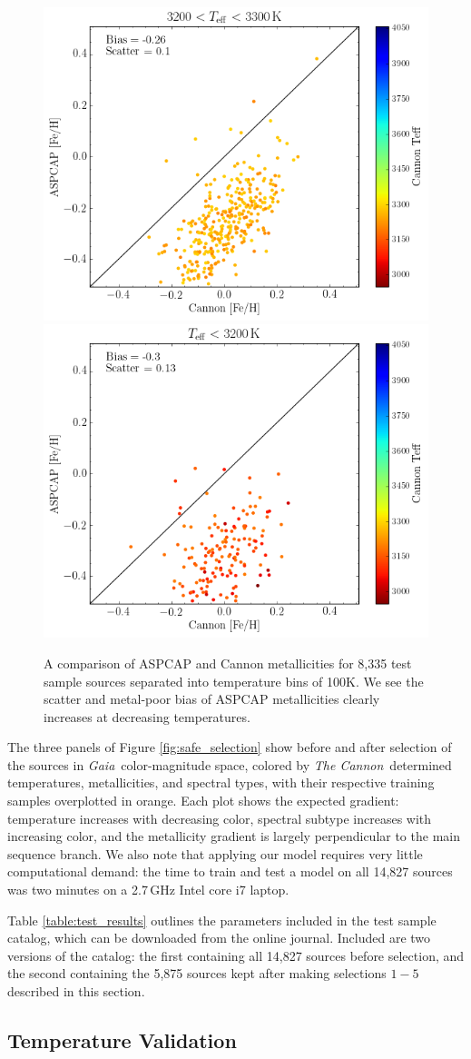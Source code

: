 \documentclass[twocolumn]{aastex62}
\newcommand{\thecannon}{\textsl{The Cannon}}
\newcommand{\gaia}{\textsl{Gaia}}
\begin{document}
\begin{figure}
\begin{center}
	\includegraphics[width=.3\linewidth]{met_comp8.png}
	\includegraphics[width=.3\linewidth]{met_comp9.png} 
	\caption{A comparison of ASPCAP and Cannon metallicities for 8,335 test sample sources separated into temperature bins of 100K. We see the scatter and metal-poor bias of ASPCAP metallicities clearly increases at decreasing temperatures.} 
	\label{fig:met_comp}
\end{center}
\end{figure}


The three panels of Figure \ref{fig:safe_selection} show before and after selection of the sources in \gaia\ color-magnitude space, colored by \thecannon\ determined temperatures, metallicities, and spectral types, with their respective training samples overplotted in orange. Each plot shows the expected gradient: temperature increases with decreasing color, spectral subtype increases with increasing color, and the metallicity gradient is largely perpendicular to the main sequence branch. 
We also note that applying our model requires very little computational demand: the time to train and test a model on all 14,827 sources was two minutes on a 2.7\,GHz Intel core i7 laptop. 

Table \ref{table:test_results} outlines the parameters included in the test sample catalog, which can be downloaded from the online journal. Included are two versions of the catalog: the first containing all 14,827 sources before selection, and the second containing the 5,875 sources kept after making selections $1-5$ described in this section.

\subsection{Temperature Validation}
\end{document}
